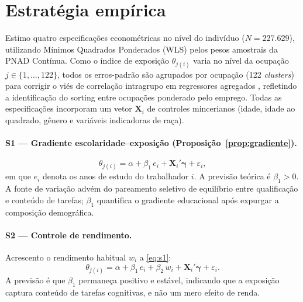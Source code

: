 \section{Estratégia empírica}
\label{sec:estrategia}

Estimo quatro especificações econométricas no nível do indivíduo ($N = 227.629$), utilizando Mínimos Quadrados Ponderados (WLS) pelos pesos amostrais da PNAD Contínua. Como o índice de exposição $\theta_{j(i)}$ varia no nível da ocupação $j \in \{1, \dots, 122\}$, todos os erros-padrão são agrupados por ocupação (122 \emph{clusters}) para corrigir o viés de correlação intragrupo em regressores agregados \citep{moulton1986random}, refletindo a identificação do sorting entre ocupações ponderado pelo emprego. Todas as especificações incorporam um vetor $\mathbf{X}_i$ de controles mincerianos (idade, idade ao quadrado, gênero e variáveis indicadoras de raça).

\paragraph{S1 --- Gradiente escolaridade--exposição (Proposição~\ref{prop:gradiente}).}
\begin{equation}
    \theta_{j(i)} = \alpha + \beta_1 \, e_i + \mathbf{X}_i' \boldsymbol{\gamma} + \varepsilon_i,
    \label{eq:s1}
\end{equation}
em que $e_i$ denota os anos de estudo do trabalhador $i$. A previsão teórica é $\beta_1 > 0$. A fonte de variação advém do pareamento seletivo de equilíbrio entre qualificação e conteúdo de tarefas; $\beta_1$ quantifica o gradiente educacional após expurgar a composição demográfica.

\paragraph{S2 --- Controle de rendimento.}
Acrescento o rendimento habitual $w_i$ a \eqref{eq:s1}:
\begin{equation}
    \theta_{j(i)} = \alpha + \beta_1 \, e_i + \beta_2 \, w_i + \mathbf{X}_i' \boldsymbol{\gamma} + \varepsilon_i.
    \label{eq:s2}
\end{equation}
A previsão é que $\beta_1$ permaneça positivo e estável, indicando que a exposição captura conteúdo de tarefas cognitivas, e não um mero efeito de renda.

